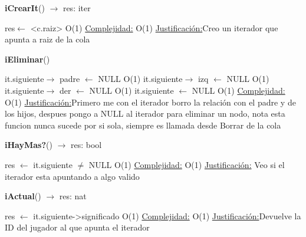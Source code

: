 \begin{Representacion}
\begin{Algoritmos}

\begin{algorithm}[H]{\textbf{iCrearIt}() $\to$ res: iter}
	\begin{algorithmic}[1]
		\State res$\gets$ <c.raiz> \Comment O(1)
		\medskip
		\Statex \underline{Complejidad:} O(1)
			\Statex \underline{Justificación:}Creo un iterador que apunta a raiz de la cola
	\end{algorithmic}
\end{algorithm}

\begin{algorithm}[H]{\textbf{iEliminar}()}
	\begin{algorithmic}[1]
		\State it.siguiente$\to$ padre $\gets$ NULL \Comment O(1)		
		\State it.siguiente$\to$ izq $\gets$ NULL \Comment O(1)		
		\State it.siguiente$\to$ der $\gets$ NULL \Comment O(1)		
		\State it.siguiente $\gets$ NULL \Comment O(1)		
		\medskip
		\Statex \underline{Complejidad:} O(1)
			\Statex \underline{Justificación:}Primero me con el iterador borro la relación con el padre y de los hijos, despues pongo a NULL al iterador para eliminar un nodo, nota esta funcion nunca sucede por si sola, siempre es llamada desde Borrar de la cola
	\end{algorithmic}
\end{algorithm}

\begin{algorithm}[H]{\textbf{iHayMas?}() $\to$ res: bool}
	\begin{algorithmic}[1]
		\State res $\gets$ it.siguiente $\neq$ NULL \Comment O(1)
		\medskip
		\Statex \underline{Complejidad:} O(1)
			\Statex \underline{Justificación:} Veo si el iterador esta apuntando a algo valido
	\end{algorithmic}
\end{algorithm}

\begin{algorithm}[H]{\textbf{iActual}() $\to$ res: nat}
	\begin{algorithmic}[1]
		\State res $\gets$ it.siguiente->significado \Comment O(1)		
		\medskip
		\Statex \underline{Complejidad:} O(1)
			\Statex \underline{Justificación:}Devuelve la ID del jugador al que apunta el iterador
	\end{algorithmic}
\end{algorithm}


\end{Algoritmos}

\end{Representacion}
